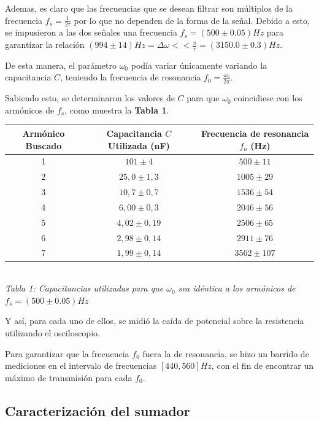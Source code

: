 \documentclass[11pt,a4paper]{article}
\begin{document}
Ademas, es claro que las frecuencias que se desean filtrar son múltiplos de la frecuencia $f_s = \frac{1}{2\tau}$ por lo que no dependen de la forma de la señal. Debido a esto, se impusieron a las dos señales una frecuencia $f_s = (500 \pm 0.05) Hz$ para garantizar la relación $(994\pm 14)Hz=\Delta\omega << \frac{\pi}{\tau} = (3150.0 \pm 0.3)Hz$.

De esta manera, el parámetro $\omega_0$ podía variar únicamente variando la capacitancia $C$, teniendo la frecuencia de resonancia $f_0= \frac{\omega_0}{2\pi}$.

Sabiendo esto, se determinaron los valores de $C$ para que $\omega_0$ coincidiese con los armónicos de $f_s$, como muestra la \textbf{Tabla 1}.

\begin{center}

\begin{tabular}{||c|c|c||}
\hline 
\textbf{Armónico Buscado} & \textbf{Capacitancia $C$ Utilizada (nF)} & \textbf{Frecuencia de resonancia $f_o$ (Hz)} \\ \hline 
 1 & $101 \pm 4$ & $500 \pm 11$ \\ \hline 
 2 & $25,0 \pm 1,3$ & $1005 \pm 29$ \\ \hline 
 3 & $10,7 \pm 0,7$ & $1536 \pm 54$ \\ \hline 
 4 & $6,00 \pm 0,3$ & $2046 \pm 56$ \\ \hline 
 5 & $4,02 \pm 0,19$ & $2506 \pm 65$ \\ \hline 
 6 & $2,98 \pm 0,14$ & $2911 \pm 76$ \\ \hline 
 7 & $1,99 \pm 0,14$ & $3562 \pm 107$ \\ \hline
\end{tabular}
\\[0.3cm] 
\textit{Tabla 1: Capacitancias utilizadas para que $\omega_0$ sea idéntica a los armónicos de $f_s = (500 \pm 0.05) Hz$}

\end{center}

 Y así, para cada uno de ellos, se midió la caída de potencial sobre la resistencia utilizando el osciloscopio. 

Para garantizar que la frecuencia $f_0$ fuera la de resonancia, se hizo un barrido de mediciones en el intervalo de frecuencias $[440,560] Hz$, con el fin de encontrar un máximo de transmisión para cada $f_0$.


\subsection{Caracterización del sumador}
\end{document}
